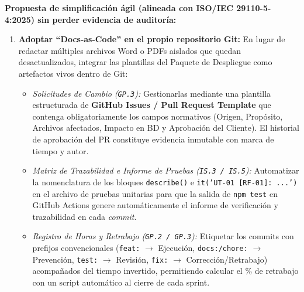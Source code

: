 \documentclass[11pt,a4paper]{article}
\begin{document}
\textbf{Propuesta de simplificación ágil (alineada con ISO/IEC 29110-5-4:2025) sin perder evidencia de auditoría:}
\begin{enumerate}[noitemsep]
  \item \textbf{Adoptar ``Docs-as-Code'' en el propio repositorio Git:} En lugar de redactar múltiples archivos Word o PDFs aislados que quedan desactualizados, integrar las plantillas del Paquete de Despliegue como artefactos vivos dentro de Git:
  \begin{itemize}[noitemsep]
    \item \textit{Solicitudes de Cambio (\texttt{GP.3}):} Gestionarlas mediante una plantilla estructurada de \textbf{GitHub Issues / Pull Request Template} que contenga obligatoriamente los campos normativos (Origen, Propósito, Archivos afectados, Impacto en BD y Aprobación del Cliente). El historial de aprobación del PR constituye evidencia inmutable con marca de tiempo y autor.
    \item \textit{Matriz de Trazabilidad e Informe de Pruebas (\texttt{IS.3 / IS.5}):} Automatizar la nomenclatura de los bloques \texttt{describe()} e \texttt{it('UT-01 [RF-01]: ...')} en el archivo de pruebas unitarias para que la salida de \texttt{npm test} en GitHub Actions genere automáticamente el informe de verificación y trazabilidad en cada \textit{commit}.
    \item \textit{Registro de Horas y Retrabajo (\texttt{GP.2 / GP.3}):} Etiquetar los commits con prefijos convencionales (\texttt{feat:} $\rightarrow$ Ejecución, \texttt{docs:/chore:} $\rightarrow$ Prevención, \texttt{test:} $\rightarrow$ Revisión, \texttt{fix:} $\rightarrow$ Corrección/Retrabajo) acompañados del tiempo invertido, permitiendo calcular el \% de retrabajo con un script automático al cierre de cada sprint.
  \end{itemize}
\end{enumerate}
\end{document}
